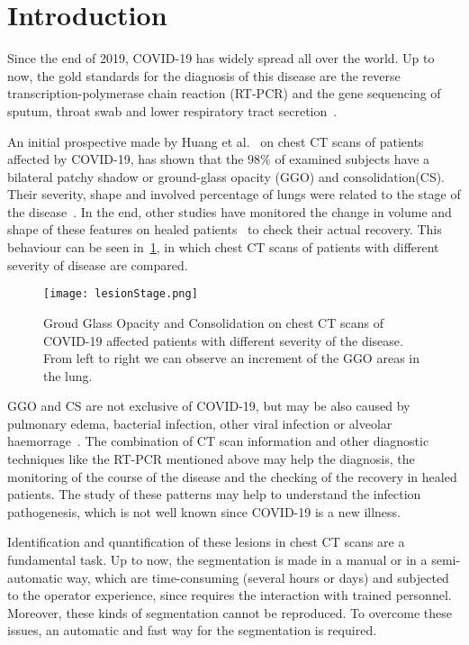 \documentclass{standalone}
\begin{document}
\chapter*{Introduction}



	Since the end of 2019, COVID-19 has widely spread all over the world. Up to now, the gold standards for the diagnosis of this disease are the reverse transcription-polymerase chain reaction (RT-PCR) and the gene sequencing of sputum, throat swab and lower respiratory tract secretion~\cite{ART:Zhao}.

	An initial prospective made by Huang et al.~\cite{ART:Huang} on chest CT scans of patients affected by COVID-19, has shown that the $98\%$ of examined subjects have a bilateral patchy shadow or ground-glass opacity (GGO) and consolidation(CS). Their severity, shape and involved percentage of lungs were related to the stage of the disease~\cite{ART:Bernheim}. In the end, other studies have monitored the change in volume and shape of these features on healed patients~\cite{ART:Ai} to check their actual recovery. This behaviour can be seen in \figurename\,\ref{fig:HealthVSCovid}, in which chest CT scans of patients with different severity of disease are compared.

	\begin{figure}[h!]
		\centering
			\texttt{[image: lesionStage.png]}
		\caption{Groud Glass Opacity and Consolidation on chest CT scans of COVID-19 affected patients with different severity of the disease. From left to right we can observe an increment of the GGO areas in the lung.}\label{fig:HealthVSCovid}
	\end{figure} 

	GGO and CS are not exclusive of COVID-19, but may be also caused by pulmonary edema, bacterial infection, other viral infection or alveolar haemorrage~\cite{ART:Collins}. The combination of CT scan information and other diagnostic techniques like the RT-PCR mentioned above may help the diagnosis, the monitoring of the course of the disease and the checking of the recovery in healed patients. The study of these patterns may help to understand the infection pathogenesis, which is not well known since COVID-19 is a new illness.

	Identification and quantification of these lesions in chest CT scans are a fundamental task. Up to now, the segmentation is made in a manual or in a semi-automatic way, which are time-consuming (several hours or days) and subjected to the operator experience, since requires the interaction with trained personnel. Moreover, these kinds of segmentation cannot be reproduced. To overcome these issues, an automatic and fast way for the segmentation is required.
\end{document}
